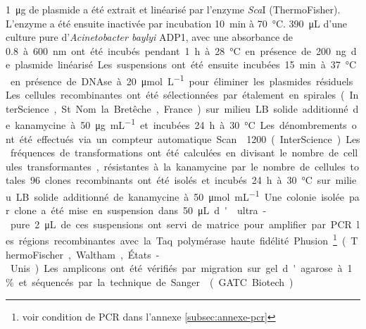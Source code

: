 \SI{1}{\ug} de plasmide a été extrait et linéarisé par l'enzyme \emph{Sca}I
(ThermoFisher). L'enzyme a été ensuite inactivée par incubation \SI{10}{\minute}
à \SI{70}{\celsius}. \SI{390}{\uL} d'une culture pure d'\emph{Acinetobacter
  baylyi} ADP1, avec une absorbance de \SI{0,8} à \SI{600}{\nm} ont été incubés
pendant \SI{1}{\hour} à \SI{28}{\celsius} en présence de \SI{200}{\ng} de
plasmide linéarisé. Les suspensions ont été ensuite incubées \SI{15}{\minute} à
\SI{37}{\celsius} en présence de DNAse à \SI{20}{\umol\per\L} pour éliminer les
plasmides résiduels. Les cellules recombinantes ont été sélectionnées par
étalement en spirales (InterScience, St Nom la Bretêche, France) sur milieu LB
solide additionné de kanamycine à \SI{50}{\ug\per\mL} et incubées \SI{24}{\hour}
à \SI{30}{\celsius}. Les dénombrements ont été effectués via un compteur
automatique Scan\textsuperscript{\textregistered}1200 (InterScience). Les
fréquences de transformations ont été calculées en divisant le nombre de
cellules transformantes, résistantes à la kanamycine par le nombre de cellules
totales. 96 clones recombinants ont été isolés et incubés \SI{24}{\hour} à
\SI{30}{\celsius} sur milieu LB solide additionné de kanamycine à
\SI{50}{\umol\per\mL} . Une colonie isolée par clone a été mise en suspension
dans \SI{50}{\uL} d' ultra-pure. \SI{2}{\uL} de ces suspensions ont
servi de matrice pour amplifier par PCR les régions recombinantes avec la Taq
polymérase haute fidélité Phusion \footnote{voir condition de PCR dans l'annexe
  \ref{subsec:annexe-pcr}} (ThermoFischer, Waltham, États-Unis). Les amplicons
ont été vérifiés par migration sur gel d'agarose à 1\% et séquencés par la
technique de Sanger\cite{sanger_dna_1977} (GATC Biotech).



